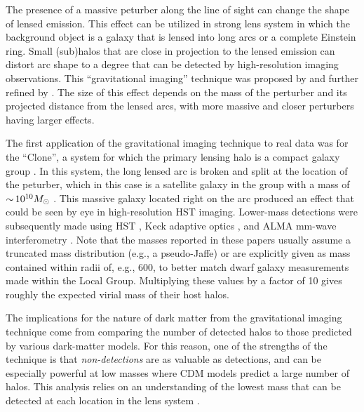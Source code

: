 \documentclass[modern,linenumbers]{aastex62}
\begin{document}
\vspace{1em} 

The presence of a massive peturber along the line of sight can change the shape of lensed emission. 
This effect can be utilized in strong lens system in which the background object is a galaxy that is lensed into long arcs or a complete Einstein ring.
Small (sub)halos that are close in projection to the lensed emission can distort arc shape to a degree that can be detected by high-resolution imaging observations.
This ``gravitational imaging'' technique was proposed by \cite{Koopmans:aa} and further refined by \citet{Vegetti:2008aa,Vegetti:2009aa}.  The size of this effect depends on the mass of the perturber and its projected distance from the lensed arcs, with more massive and closer perturbers having larger effects.
 
The first application of the gravitational imaging technique to real data was for the ``Clone'', a system for which the primary lensing halo is a compact galaxy group \citep[,][]{Vegetti_2010_1}.
 In this system, the long lensed arc is broken and split at the location of the peturber, which in this case is a satellite galaxy in the group with a mass of $ {\sim}\, 10^{10} M_\odot$ \citep[][]{Vegetti_2010_1}.  This massive galaxy located right on the arc produced an effect that could be seen by eye in high-resolution HST imaging.  Lower-mass detections were subsequently made using HST \citep[$\roughly 10^9 \Msun$;][]{Vegetti_2010_2}, Keck adaptive optics \citep[$\roughly 10^8 \Msun$][]{Vegetti_2012}, and ALMA mm-wave interferometry \citep[$\roughly 10^8 \Msun$][]{Hezaveh_2016ltk}.  
 Note that the masses reported in these papers usually assume a truncated mass distribution (e.g., a pseudo-Jaffe) or are explicitly given as mass contained within radii of, e.g., 600\pc, to better match dwarf galaxy measurements made within the Local Group.  Multiplying these values by a factor of 10 gives roughly the expected virial mass of their host halos.
 
The implications for the nature of dark matter from the gravitational imaging technique come from comparing the number of detected halos to those predicted by various dark-matter models.  
For this reason, one of the strengths of the technique is that {\em non-detections} are as valuable as detections, and can be especially powerful at low masses where CDM models predict a large number of halos.
This analysis relies on an understanding of the lowest mass that can be detected at each location in the lens system \citep[e.g.,][]{Vegetti2014, Hezaveh_2016ltk, Ritondale++18}.
 
\end{document}
